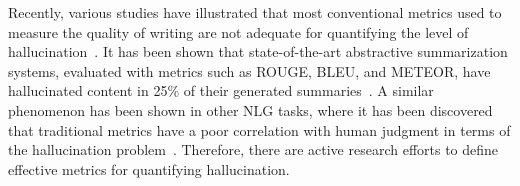 \label{section:metric}
Recently, various studies have illustrated that most conventional metrics used to measure the quality of writing are not adequate for quantifying the level of hallucination~. It has been shown that state-of-the-art abstractive summarization systems, evaluated with metrics such as ROUGE, BLEU, and METEOR, have hallucinated content in 25\% of their generated summaries~. A similar phenomenon has been shown in other NLG tasks, where it has been discovered that traditional metrics have a poor correlation with human judgment in terms of the hallucination problem~. 
Therefore, there are active research efforts to define effective metrics for quantifying hallucination. 

